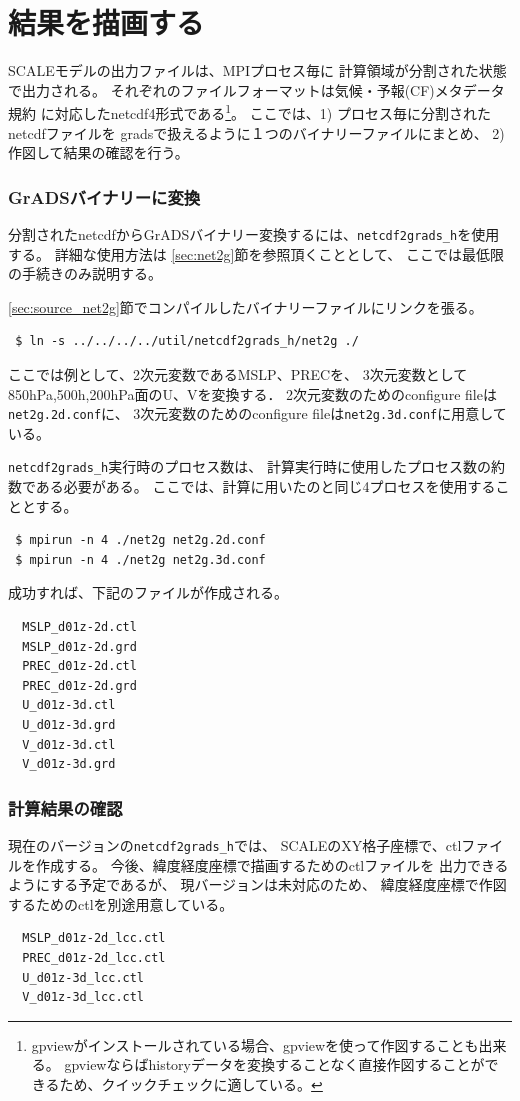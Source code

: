 \section{結果を描画する}
\label{sec:quicklook}

SCALEモデルの出力ファイルは、MPIプロセス毎に
計算領域が分割された状態で出力される。
それぞれのファイルフォーマットは気候・予報(CF)メタデータ規約
に対応したnetcdf4形式である\footnote{gpviewがインストールされている場合、gpviewを使って作図することも出来る。
gpviewならばhistoryデータを変換することなく直接作図することができるため、クイックチェックに適している。}。
ここでは、1) プロセス毎に分割されたnetcdfファイルを
gradsで扱えるように１つのバイナリーファイルにまとめ、
2) 作図して結果の確認を行う。

\subsubsection{GrADSバイナリーに変換}
分割されたnetcdfからGrADSバイナリー変換するには、\verb|netcdf2grads_h|を使用する。
詳細な使用方法は \ref{sec:net2g}節を参照頂くこととして、
ここでは最低限の手続きのみ説明する。

\ref{sec:source_net2g}節でコンパイルしたバイナリーファイルにリンクを張る。
\begin{verbatim}
 $ ln -s ../../../../util/netcdf2grads_h/net2g ./
\end{verbatim}
ここでは例として、2次元変数であるMSLP、PRECを、
3次元変数として850hPa,500h,200hPa面のU、Vを変換する．
2次元変数のためのconfigure fileは\verb|net2g.2d.conf|に、
3次元変数のためのconfigure fileは\verb|net2g.3d.conf|に用意している。

\verb|netcdf2grads_h|実行時のプロセス数は、
計算実行時に使用したプロセス数の約数である必要がある。
ここでは、計算に用いたのと同じ4プロセスを使用することとする。
\begin{verbatim}
 $ mpirun -n 4 ./net2g net2g.2d.conf
 $ mpirun -n 4 ./net2g net2g.3d.conf
\end{verbatim}
成功すれば、下記のファイルが作成される。
\begin{verbatim}
  MSLP_d01z-2d.ctl
  MSLP_d01z-2d.grd
  PREC_d01z-2d.ctl
  PREC_d01z-2d.grd
  U_d01z-3d.ctl
  U_d01z-3d.grd
  V_d01z-3d.ctl
  V_d01z-3d.grd
\end{verbatim}


\subsubsection{計算結果の確認}
現在のバージョンの\verb|netcdf2grads_h|では、
SCALEのXY格子座標で、ctlファイルを作成する。
今後、緯度経度座標で描画するためのctlファイルを
出力できるようにする予定であるが、
現バージョンは未対応のため、
緯度経度座標で作図するためのctlを別途用意している。
\begin{verbatim}
  MSLP_d01z-2d_lcc.ctl
  PREC_d01z-2d_lcc.ctl
  U_d01z-3d_lcc.ctl
  V_d01z-3d_lcc.ctl
\end{verbatim}

